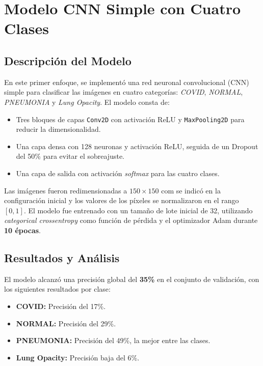 \documentclass{article}
\begin{document}
	\section{Modelo CNN Simple con Cuatro Clases}
	
	\subsection{Descripción del Modelo}
	
	En este primer enfoque, se implementó una red neuronal convolucional (CNN) simple para clasificar las imágenes en cuatro categorías: \textit{COVID}, \textit{NORMAL}, \textit{PNEUMONIA} y \textit{Lung Opacity}. El modelo consta de:
	\begin{itemize}
		\item Tres bloques de capas \texttt{Conv2D} con activación ReLU y \texttt{MaxPooling2D} para reducir la dimensionalidad.
		\item Una capa densa con 128 neuronas y activación ReLU, seguida de un Dropout del 50\% para evitar el sobreajuste.
		\item Una capa de salida con activación \textit{softmax} para las cuatro clases.
	\end{itemize}
	
	Las imágenes fueron redimensionadas a $150\times150$ com se indicó en la configuración inicial y los valores de los píxeles se normalizaron en el rango $[0,1]$. El modelo fue entrenado con un tamaño de lote inicial de 32, utilizando \textit{categorical crossentropy} como función de pérdida y el optimizador Adam durante \textbf{10 épocas}.
	
	\subsection{Resultados y Análisis}
	
	El modelo alcanzó una precisión global del \textbf{35\%} en el conjunto de validación, con los siguientes resultados por clase:
	
	\begin{itemize}
		\item \textbf{COVID:} Precisión del 17\%.
		\item \textbf{NORMAL:} Precisión del 29\%.
		\item \textbf{PNEUMONIA:} Precisión del 49\%, la mejor entre las clases.
		\item \textbf{Lung Opacity:} Precisión baja del 6\%.
	\end{itemize}
	
\end{document}
